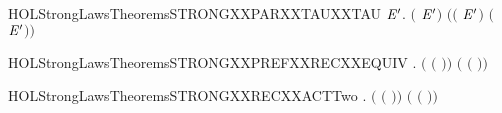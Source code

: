 \begin{SaveVerbatim}{HOLStrongLawsTheoremsSTRONGXXPARXXTAUXXTAU}
\HOLTokenTurnstile{} \HOLSymConst{\HOLTokenForall{}} \ensuremath{\HOLBoundVar{E}\sp{\prime{}}}.
      \ensuremath{(}\HOLConst{\ensuremath{\tau}}\HOLSymConst{\ensuremath{\ldotp}} \HOLSymConst{\ensuremath{\mid}} \HOLConst{\ensuremath{\tau}}\HOLSymConst{\ensuremath{\ldotp}}\ensuremath{\HOLBoundVar{E}\sp{\prime{}}}\ensuremath{)} \ensuremath{(}\HOLConst{\ensuremath{\tau}}\HOLSymConst{\ensuremath{\ldotp}}\ensuremath{(} \HOLSymConst{\ensuremath{\mid}} \HOLConst{\ensuremath{\tau}}\HOLSymConst{\ensuremath{\ldotp}}\ensuremath{\HOLBoundVar{E}\sp{\prime{}}}\ensuremath{)} \HOLSymConst{\ensuremath{+}} \HOLConst{\ensuremath{\tau}}\HOLSymConst{\ensuremath{\ldotp}}\ensuremath{(}\HOLConst{\ensuremath{\tau}}\HOLSymConst{\ensuremath{\ldotp}} \HOLSymConst{\ensuremath{\mid}} \ensuremath{\HOLBoundVar{E}\sp{\prime{}}}\ensuremath{)}\ensuremath{)}
\end{SaveVerbatim}
\newcommand{\HOLStrongLawsTheoremsSTRONGXXPARXXTAUXXTAU}{\UseVerbatim{HOLStrongLawsTheoremsSTRONGXXPARXXTAUXXTAU}}
\begin{SaveVerbatim}{HOLStrongLawsTheoremsSTRONGXXPREFXXRECXXEQUIV}
\HOLTokenTurnstile{} \HOLSymConst{\HOLTokenForall{}}  .
      \ensuremath{(}\HOLSymConst{\ensuremath{\ldotp}}  \ensuremath{(}\HOLSymConst{\ensuremath{\ldotp}}\HOLSymConst{\ensuremath{\ldotp}} \ensuremath{)}\ensuremath{)} \ensuremath{(}  \ensuremath{(}\HOLSymConst{\ensuremath{\ldotp}}\HOLSymConst{\ensuremath{\ldotp}} \ensuremath{)}\ensuremath{)}
\end{SaveVerbatim}
\newcommand{\HOLStrongLawsTheoremsSTRONGXXPREFXXRECXXEQUIV}{\UseVerbatim{HOLStrongLawsTheoremsSTRONGXXPREFXXRECXXEQUIV}}
\begin{SaveVerbatim}{HOLStrongLawsTheoremsSTRONGXXRECXXACTTwo}
\HOLTokenTurnstile{} \HOLSymConst{\HOLTokenForall{}} .  \ensuremath{(}  \ensuremath{(}\HOLSymConst{\ensuremath{\ldotp}}\HOLSymConst{\ensuremath{\ldotp}} \ensuremath{)}\ensuremath{)} \ensuremath{(}  \ensuremath{(}\HOLSymConst{\ensuremath{\ldotp}} \ensuremath{)}\ensuremath{)}
\end{SaveVerbatim}
